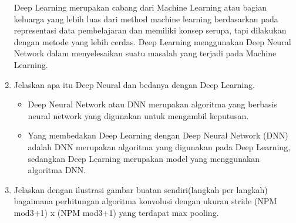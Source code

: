 \begin{enumerate}
\subitem Deep Learning merupakan cabang dari Machine Learning atau bagian keluarga yang lebih luas dari method machine learning berdasarkan pada representasi data pembelajaran dan memiliki konsep serupa, tapi dilakukan dengan metode yang lebih cerdas. Deep Learning menggunakan Deep Neural Network dalam menyelesaikan suatu masalah yang terjadi pada Machine Learning.
\item Jelaskan apa itu Deep Neural dan bedanya dengan Deep Learning.
\begin{itemize}
\item Deep Neural Network atau DNN merupakan algoritma yang berbasis neural network yang digunakan untuk mengambil keputusan.
\item Yang membedakan Deep Learning dengan  Deep Neural Network (DNN) adalah DNN merupakan algoritma yang digunakan pada Deep Learning, sedangkan Deep Learning merupakan model yang menggunakan algoritma DNN.
\end{itemize}
\item Jelaskan dengan ilustrasi gambar buatan sendiri(langkah per langkah) bagaimana perhitungan algoritma konvolusi dengan ukuran stride (NPM mod3+1) x (NPM mod3+1) yang terdapat max pooling.
\end{enumerate}